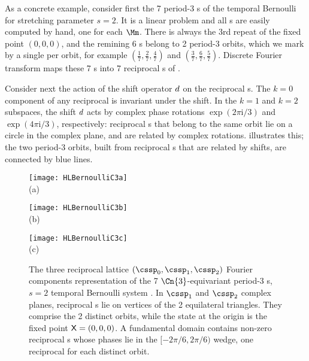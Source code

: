 As a concrete example, consider first the 7 period-3 {\lattstate}s of
the temporal Bernoulli  for stretching parameter $s=2$.
It is a linear problem and all {\lattstate}s are easily computed
by hand, one for each $\Mm$. There is always the 3rd repeat of the
fixed point {\lattstate} $(0,0,0)$, and the remining 6 {\lattstate}s
belong to 2 period-3 orbits, which we mark by a single {\lattstate}
per orbit, for example
$(\frac{1}{7},\frac{2}{7},\frac{4}{7})$
and
$(\frac{3}{7},\frac{6}{7},\frac{5}{7})$.
Discrete Fourier transform maps
these 7 {\lattstate}s into 7 reciprocal {\lattstate}s of .

Consider next the action of the shift operator $d$ on the reciprocal
{\lattstate}s. The $k=0$ component of any reciprocal {\lattstate} is
invariant under the shift. In the $k=1$ and $k=2$ subspaces, the shift
$d$ acts by complex phase rotations $\exp(2 \pi \mathrm{i}/3)$ and
$\exp(4 \pi \mathrm{i}/3)$, respectively: reciprocal {\lattstate}s that
belong to the same orbit lie on a circle in the complex plane, and are
related by complex rotations.  illustrates
this; the two period-3 orbits, built from reciprocal {\lattstate}s that
are related by shifts, are connected by blue lines.


\begin{figure}
  \centering
            \begin{minipage}[c]{0.3\textwidth}\begin{center}
\texttt{[image: HLBernoulliC3a]}\\(a)
            \end{center}\end{minipage}
            \begin{minipage}[c]{0.3\textwidth}\begin{center}
\texttt{[image: HLBernoulliC3b]}\\(b)
            \end{center}\end{minipage}
            \begin{minipage}[c]{0.3\textwidth}\begin{center}
\texttt{[image: HLBernoulliC3c]}\\(c)
            \end{center}\end{minipage}
  \caption{\label{fig:BernC3}
The three reciprocal lattice $(\cssp_{0},\cssp_{1},\cssp_{2})$ Fourier
components representation of the 7 $\Cn{3}$-equivariant period-3
{\lattstate}s, $s=2$ {temporal Bernoulli system} . In
$\cssp_1$ and $\cssp_2$ complex planes, reciprocal {\lattstate}s lie on
vertices of the 2 equilateral triangles. They comprise the 2 distinct
 orbits, while the state at the origin is the fixed point
$\mathsf{X}=(0,0,0)$.
A  fundamental domain contains non-zero reciprocal
{\lattstate}s whose phases lie in the $[-2\pi/6,2\pi/6)$ wedge, one reciprocal
{\lattstate} for each distinct  orbit.
}
\end{figure}

